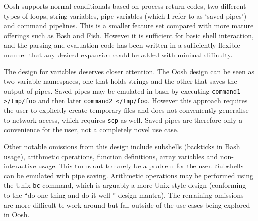 \documentclass[12pt,twoside,notitlepage]{report}
\begin{document}
Oosh supports normal conditionals based on process return codes, two
different types of loops, string variables, pipe variables (which I
refer to as `saved pipes') and command pipelines. This is a smaller
feature set compared with more mature offerings such as Bash and
Fish. However it is sufficient for basic shell interaction, and the
parsing and evaluation code has been written in a sufficiently
flexible manner that any desired expansion could be added with minimal
difficulty.

The design for variables deserves closer attention. The Oosh design
can be seen as two variable namespaces, one that holds strings and the
other that saves the output of pipes. Saved pipes may be emulated in
bash by executing {\tt command1 >/tmp/foo} and then later {\tt command2
  </tmp/foo}. However this approach requires the user to explicitly
create temporary files and does not conveniently generalise to network
access, which requires {\tt scp} as well. Saved pipes are therefore
only a convenience for the user, not a completely novel use case.

Other notable omissions from this design include subshells (backticks
in Bash usage), arithmetic operations, function definitions, array
variables and non-interactive usage. This turns out to rarely be a
problem for the user. Subshells can be emulated with pipe
saving. Arithmetic operations may be performed using the Unix {\tt bc}
command, which is arguably a more Unix style design (conforming to the
``do one thing and do it well '' design mantra). The remaining
omissions are more difficult to work around but fall outside of the
use cases being explored in Oosh.
\end{document}
